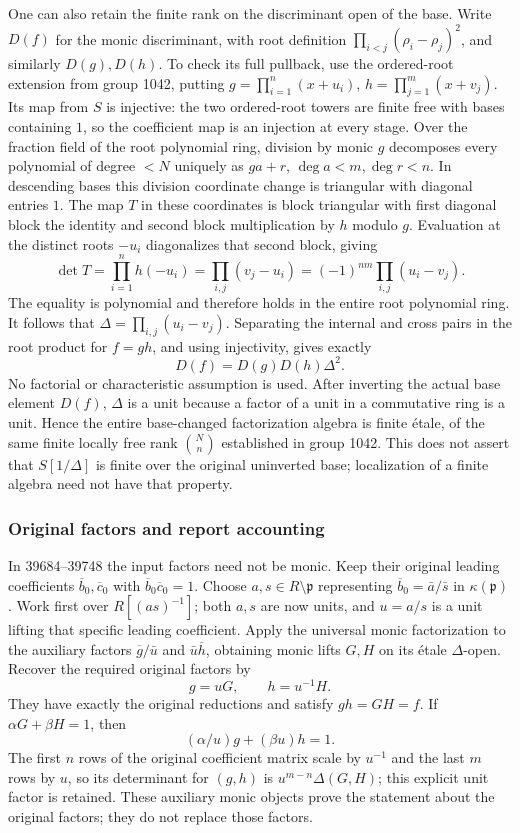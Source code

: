 One can also retain the finite rank on the discriminant open of the base. Write \(D(f)\) for the monic discriminant, with root definition \(\prod_{i<j}(\rho_i-\rho_j)^2\), and similarly \(D(g),D(h)\). To check its full pullback, use the ordered-root extension from group 1042, putting \(g=\prod_{i=1}^n(x+u_i)\), \(h=\prod_{j=1}^m(x+v_j)\). Its map from \(S\) is injective: the two ordered-root towers are finite free with bases containing \(1\), so the coefficient map is an injection at every stage. Over the fraction field of the root polynomial ring, division by monic \(g\) decomposes every polynomial of degree \(<N\) uniquely as \(ga+r\), \(\deg a<m,\deg r<n\). In descending bases this division coordinate change is triangular with diagonal entries \(1\). The map \(T\) in these coordinates is block triangular with first diagonal block the identity and second block multiplication by \(h\) modulo \(g\). Evaluation at the distinct roots \(-u_i\) diagonalizes that second block, giving \[
\det T=\prod_{i=1}^n h(-u_i)
 =\prod_{i,j}(v_j-u_i)=(-1)^{nm}\prod_{i,j}(u_i-v_j).
\] The equality is polynomial and therefore holds in the entire root polynomial ring. It follows that \(\Delta=\prod_{i,j}(u_i-v_j)\). Separating the internal and cross pairs in the root product for \(f=gh\), and using injectivity, gives exactly \[
D(f)=D(g)D(h)\Delta^2.
\] No factorial or characteristic assumption is used. After inverting the actual base element \(D(f)\), \(\Delta\) is a unit because a factor of a unit in a commutative ring is a unit. Hence the entire base-changed factorization algebra is finite étale, of the same finite locally free rank \(\binom{N}{n}\) established in group 1042. This does not assert that \(S[1/\Delta]\) is finite over the original uninverted base; localization of a finite algebra need not have that property.

\subsubsection{Original factors and report accounting}\label{original-factors-and-report-accounting}

In 39684--39748 the input factors need not be monic. Keep their original leading coefficients \(\overline b_0,\overline c_0\) with \(\overline b_0\overline c_0=1\). Choose \(a,s\in R\setminus\mathfrak p\) representing \(\overline b_0=\bar a/\bar s\) in \(\kappa(\mathfrak p)\). Work first over \(R[(as)^{-1}]\); both \(a,s\) are now units, and \(u=a/s\) is a unit lifting that specific leading coefficient. Apply the universal monic factorization to the auxiliary factors \(\overline g/\bar u\) and \(\bar u\overline h\), obtaining monic lifts \(G,H\) on its étale \(\Delta\)-open. Recover the required original factors by \[
g=uG,\qquad h=u^{-1}H.
\] They have exactly the original reductions and satisfy \(gh=GH=f\). If \(\alpha G+\beta H=1\), then \[
(\alpha/u)g+(\beta u)h=1.
\] The first \(n\) rows of the original coefficient matrix scale by \(u^{-1}\) and the last \(m\) rows by \(u\), so its determinant for \((g,h)\) is \(u^{m-n}\Delta(G,H)\); this explicit unit factor is retained. These auxiliary monic objects prove the statement about the original factors; they do not replace those factors.

